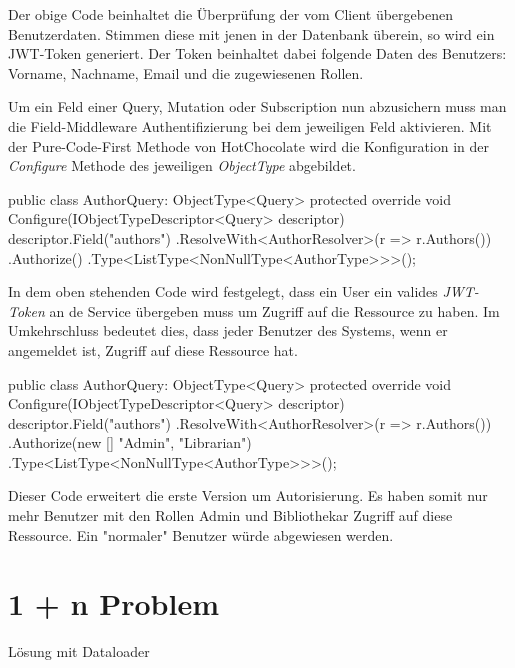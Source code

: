 Der obige Code beinhaltet die Überprüfung der vom Client übergebenen Benutzerdaten.
Stimmen diese mit jenen in der Datenbank überein, so wird ein JWT-Token generiert.
Der Token beinhaltet dabei folgende Daten des Benutzers: Vorname, Nachname, Email und die zugewiesenen Rollen.

Um ein Feld einer Query, Mutation oder Subscription nun abzusichern muss man die Field-Middleware Authentifizierung bei dem jeweiligen Feld aktivieren.
Mit der Pure-Code-First Methode von HotChocolate wird die Konfiguration in der \textit{Configure} Methode des jeweiligen \textit{ObjectType} abgebildet.

\begin{JsCode}
public class AuthorQuery: ObjectType<Query> {
    protected override void Configure(IObjectTypeDescriptor<Query> descriptor) {
        descriptor.Field("authors")
            .ResolveWith<AuthorResolver>(r => r.Authors())
            .Authorize()
            .Type<ListType<NonNullType<AuthorType>>>();
    }
}
\end{JsCode}

In dem oben stehenden Code wird festgelegt, dass ein User ein valides \textit{JWT-Token} an de Service übergeben muss um Zugriff auf die Ressource zu haben.
Im Umkehrschluss bedeutet dies, dass jeder Benutzer des Systems, wenn er angemeldet ist, Zugriff auf diese Ressource hat.
\newline

\begin{JsCode}
public class AuthorQuery: ObjectType<Query> {
    protected override void Configure(IObjectTypeDescriptor<Query> descriptor) {
        descriptor.Field("authors")
            .ResolveWith<AuthorResolver>(r => r.Authors())
            .Authorize(new [] {"Admin", "Librarian"})
            .Type<ListType<NonNullType<AuthorType>>>();
    }
}
\end{JsCode}
Dieser Code erweitert die erste Version um Autorisierung.
Es haben somit nur mehr Benutzer mit den Rollen Admin und Bibliothekar Zugriff auf diese Ressource.
Ein "normaler" Benutzer würde abgewiesen werden.

\section{1 + n Problem}
Lösung mit Dataloader



